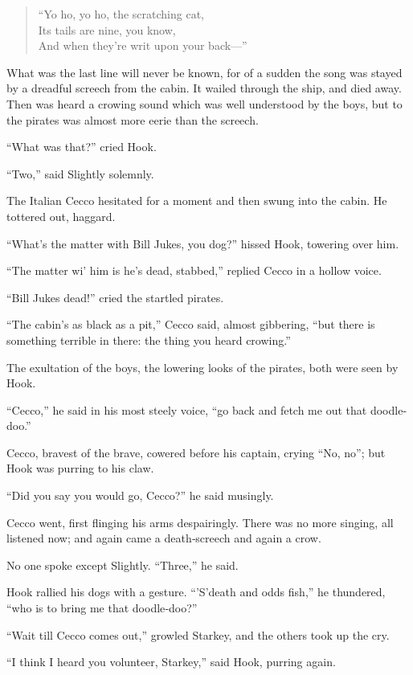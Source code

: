 \begin{verse}
	“Yo ho, yo ho, the scratching cat,\\
	Its tails are nine, you know,\\
	And when they’re writ upon your back—”
\end{verse}

What was the last line will never be known,
for of a sudden the song was stayed by a dreadful screech from the cabin.
It wailed through the ship, and died away.
Then was heard a crowing sound which was well understood by the boys,
but to the pirates was almost more eerie than the screech.

“What was that?\@” cried Hook.

“Two,” said Slightly solemnly.

The Italian Cecco hesitated for a moment and then swung into the cabin.
He tottered out, haggard.

“What’s the matter with Bill Jukes, you dog?\@” hissed Hook, towering over him.

“The matter wi’ him is he’s dead, stabbed,” replied Cecco in a hollow voice.

“Bill Jukes dead!\@” cried the startled pirates.

“The cabin’s as black as a pit,” Cecco said, almost gibbering,
“but there is something terrible in there:
the thing you heard crowing.”

The exultation of the boys, the lowering looks of the pirates, both were seen by Hook.

“Cecco,” he said in his most steely voice,
“go back and fetch me out that doodle‐doo.”

Cecco, bravest of the brave, cowered before his captain, crying “No, no”;
but Hook was purring to his claw.

“Did you say you would go, Cecco?\@” he said musingly.

Cecco went, first flinging his arms despairingly.
There was no more singing, all listened now;
and again came a death‐screech and again a crow.

No one spoke except Slightly.
“Three,” he said.

Hook rallied his dogs with a gesture.
“’S’death and odds fish,” he thundered,
“who is to bring me that doodle‐doo?”

“Wait till Cecco comes out,” growled Starkey,
and the others took up the cry.

“I think I heard you volunteer, Starkey,” said Hook, purring again.

